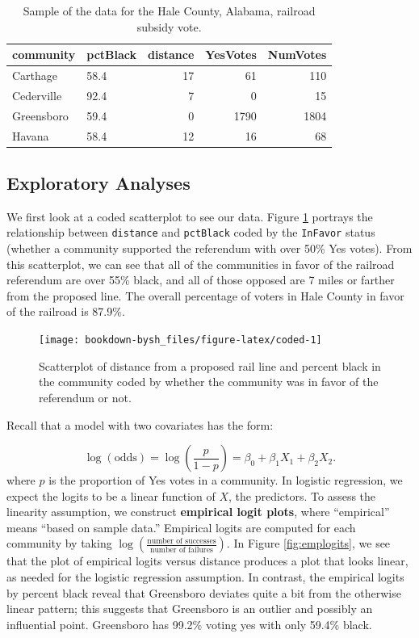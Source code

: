 \documentclass[
]{krantz}
\begin{document}
\begin{table}

\caption{\label{tab:table2chp6}Sample of the data for the Hale County, Alabama, railroad subsidy vote.}
\centering
\begin{tabular}[t]{llrrr}
\toprule
community & pctBlack & distance & YesVotes & NumVotes\\
\midrule
Carthage & 58.4 & 17 & 61 & 110\\
Cederville & 92.4 & 7 & 0 & 15\\
Greensboro & 59.4 & 0 & 1790 & 1804\\
Havana & 58.4 & 12 & 16 & 68\\
\bottomrule
\end{tabular}
\end{table}

\hypertarget{exploratory-analyses}{%
\subsection{Exploratory Analyses}\label{exploratory-analyses}}

We first look at a coded scatterplot to see our data. Figure \ref{fig:coded} portrays the relationship between \texttt{distance} and \texttt{pctBlack} coded by the \texttt{InFavor} status (whether a community supported the referendum with over 50\% Yes votes). From this scatterplot, we can see that all of the communities in favor of the railroad referendum are over 55\% black, and all of those opposed are 7 miles or farther from the proposed line. The overall percentage of voters in Hale County in favor of the railroad is 87.9\%.

\begin{figure}

{\centering \texttt{[image: bookdown-bysh\_files/figure-latex/coded-1]} 

}

\caption{ Scatterplot of distance from a proposed rail line and percent black in the community coded by whether the community was in favor of the referendum or not.}\label{fig:coded}
\end{figure}

Recall that a model with two covariates has the form:

\[\log(\textrm{odds}) = \log\left(\frac{p}{1-p}\right) = \beta_0+\beta_1X_1+\beta_2X_2.\]
where \(p\) is the proportion of Yes votes in a community. In logistic regression, we expect the logits to be a linear function of \(X\), the predictors. To assess the linearity assumption, we construct \textbf{empirical logit plots},  where ``empirical'' means ``based on sample data.'' Empirical logits are computed for each community by taking \(\log\left(\frac{\textrm{number of successes}}{\textrm{number of failures}}\right)\). In Figure \ref{fig:emplogits}, we see that the plot of empirical logits versus distance produces a plot that looks linear, as needed for the logistic regression assumption. In contrast, the empirical logits by percent black reveal that Greensboro deviates quite a bit from the otherwise linear pattern; this suggests that Greensboro is an outlier and possibly an influential point. Greensboro has 99.2\% voting yes with only 59.4\% black.
\end{document}
